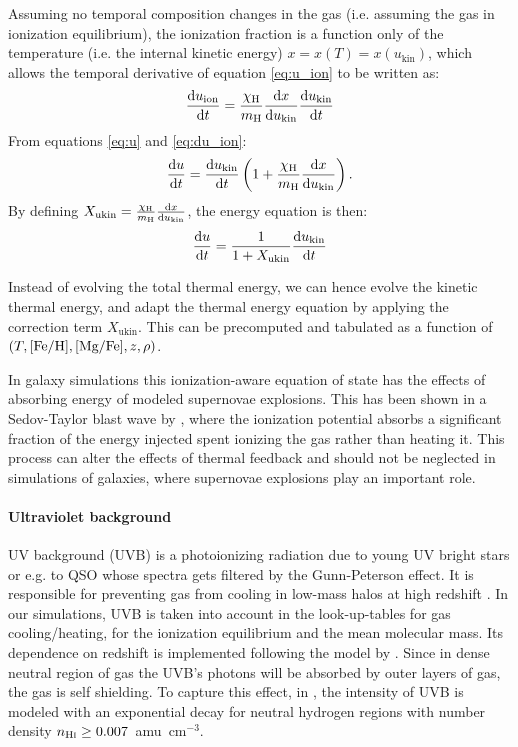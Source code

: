 Assuming no temporal composition changes in the gas (i.e. assuming the gas in ionization equilibrium), the ionization fraction is a function only of the temperature (i.e. the internal kinetic energy) $x = x(T) = x(u_\text{kin})$, which allows the temporal derivative of equation \eqref{eq:u_ion} to be written as:
\begin{equation}
\label{eq:du_ion}
\dv{u_\text{ion}}{t} = 
\frac{\chi_\text H}{m_\text H} \dv{x}{u_\text{kin}} \dv{u_\text{kin}}{t}
\end{equation}
From equations \eqref{eq:u} and \eqref{eq:du_ion}:
\begin{equation}
\dv{u}{t} = \dv{u_\text{kin}}{t} \left( 1+\frac{\chi_\text H}{m_\text H} \dv{x}{u_\text{kin}}\right).
\end{equation}
By defining $X_\text{ukin} = \frac{\chi_\text H}{m_\text H} \dv{x}{u_\text{kin}}$,
the energy equation is then:
\begin{equation}
\dv{u}{t} = \dfrac{1}{ 1 + X_\text{ukin}} \dv{u_\text{kin}}{t}
\end{equation}

Instead of evolving the total thermal energy, we can hence evolve the kinetic thermal energy, and adapt the thermal energy equation by applying the correction term $X_\text{ukin}$.
This can be precomputed and tabulated as a function of $(T, [\text{Fe}/\text{H}], [\text{Mg}/\text{Fe}], z, \rho)$.

In galaxy simulations this ionization-aware equation of state has the effects of absorbing energy of modeled supernovae explosions. This has been shown in a Sedov-Taylor blast wave by \citet{Vandenbroucke2013}, where the ionization potential absorbs a significant fraction of the energy injected spent ionizing the gas rather than heating it. This process can alter the effects of thermal feedback and should not be neglected in simulations of galaxies, where supernovae explosions play an important role.

\paragraph{Ultraviolet background}
UV background (UVB) is a photoionizing radiation due to young UV bright stars or e.g. to QSO whose spectra gets filtered by the Gunn-Peterson effect. It is responsible for preventing gas from cooling in low-mass halos at high redshift \citep{Efstathiou1992, Navarro1997}.
In our simulations, UVB is taken into account in the look-up-tables for gas cooling/heating, for the ionization equilibrium and the mean molecular mass. Its dependence on redshift is implemented following the model by \citet{Faucher-Giguere2009}.
Since in dense neutral region of gas the UVB's photons will be absorbed by outer layers of gas, the gas is self shielding. To capture this effect, in \citet{DeRijcke2013}, the intensity of UVB is modeled with an exponential decay for neutral hydrogen regions with number density $n_{\text{H}\textsc i} \geq 0.007$~amu~cm$^{-3}$.



